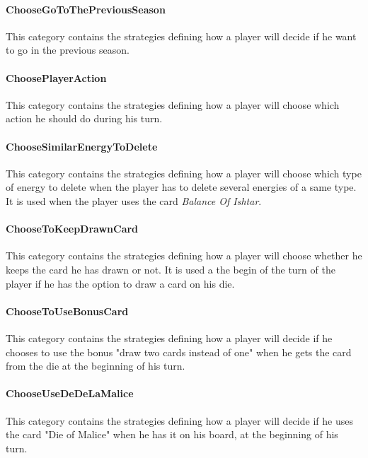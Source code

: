         \paragraph{ChooseGoToThePreviousSeason}
        This category contains the strategies defining how a player will decide if he want to go in the previous season.  
        
        \paragraph{ChoosePlayerAction}
        This category contains the strategies defining how a player will choose which action he should do during his turn.
        
        \paragraph{ChooseSimilarEnergyToDelete}
        This category contains the strategies defining how a player will choose which type of energy to delete when the player has to delete several energies of a same type. It is used when the player uses the card \textit{Balance Of Ishtar}.
        
        \paragraph{ChooseToKeepDrawnCard}
        This category contains the strategies defining how a player will choose whether he keeps the card he has drawn or not. It is used a the begin of the turn of the player if he has the option to draw a card on his die.
        
        \paragraph{ChooseToUseBonusCard}
        This category contains the strategies defining how a player will decide if he chooses to use the bonus "draw two cards instead of one" when he gets the card from the die at the beginning of his turn. 
        
        \paragraph{ChooseUseDeDeLaMalice}
        This category contains the strategies defining how a player will decide if he uses the card "Die of Malice" when he has it on his board, at the beginning of his turn.
        
